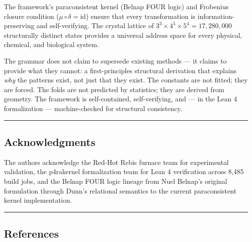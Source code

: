 \documentclass[12pt,a4paper]{article}
\begin{document}
The framework's paraconsistent kernel (Belnap FOUR logic) and Frobenius
closure condition (\(\mu \circ \delta = \text{id}\)) ensure that every
transformation is information-preserving and self-verifying. The crystal
lattice of \(3^3 \times 4^5 \times 5^4 = 17,280,000\) structurally
distinct states provides a universal address space for every physical,
chemical, and biological system.

The grammar does not claim to supersede existing methods --- it claims
to provide what they cannot: a first-principles structural derivation
that explains \emph{why} the patterns exist, not just that they exist.
The constants are not fitted; they are forced. The folds are not
predicted by statistics; they are derived from geometry. The framework
is self-contained, self-verifying, and --- in the Lean 4 formalization
--- machine-checked for structural consistency.

\begin{center}\rule{0.5\linewidth}{0.5pt}\end{center}

\hypertarget{acknowledgments}{%
\subsection{Acknowledgments}\label{acknowledgments}}

The authors acknowledge the Red-Hot Rebis furnace team for experimental
validation, the p4rakernel formalization team for Lean 4 verification
across 8,485 build jobs, and the Belnap FOUR logic lineage from Nuel
Belnap's original formulation through Dunn's relational semantics to the
current paraconsistent kernel implementation.

\begin{center}\rule{0.5\linewidth}{0.5pt}\end{center}

\hypertarget{references}{%
\subsection{References}\label{references}}
\end{document}
